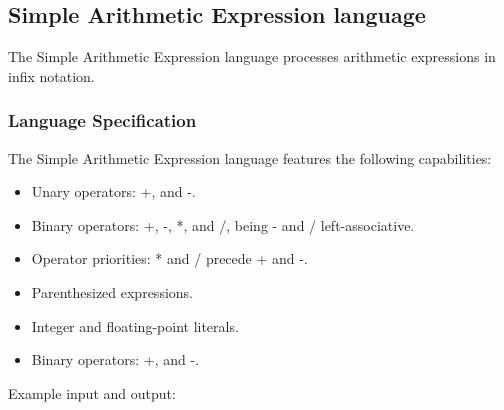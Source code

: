 \documentclass[a4paper,twoside,onecolumn]{article}
\begin{document}
\subsection{Simple Arithmetic Expression language} \label{sec:langsae}

The Simple Arithmetic Expression language processes arithmetic expressions in infix notation.

\subsubsection{Language Specification}
The Simple Arithmetic Expression language features the following capabilities:

\begin{itemize}
\item Unary operators: +, and -.
\item Binary operators: +, -, *, and /, being - and / left-associative.
\item Operator priorities: * and / precede + and -.
\item Parenthesized expressions.
\item Integer and floating-point literals.
\item Binary operators: +, and -.
\end{itemize}

Example input and output:  
\end{document}
